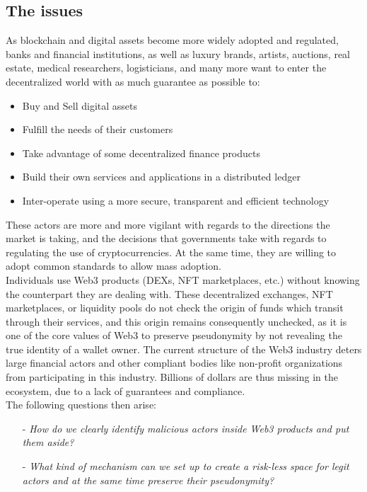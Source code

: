 ﻿\documentclass[a4paper]{article}
\begin{document}
\subsection{The issues}
As blockchain and digital assets become more widely adopted and regulated, banks and financial institutions, as well as luxury brands, artists, auctions, real estate, medical researchers, logisticians, and many more want to enter the decentralized world with as much guarantee as possible to:

\begin{itemize}
\item Buy and Sell digital assets
\item Fulfill the needs of their customers
\item Take advantage of some decentralized finance products
\item Build their own services and applications in a distributed ledger
\item Inter-operate using a more secure, transparent and efficient technology
\end{itemize}

These actors are more and more vigilant with regards to the directions the market is taking, and the decisions that governments take with regards to regulating the use of cryptocurrencies. At the same time, they are willing to adopt common standards to allow mass adoption. \\

Individuals use Web3 products (DEXs, NFT marketplaces, etc.) without knowing the counterpart they are dealing with. These decentralized exchanges, NFT marketplaces, or liquidity pools do not check the origin of funds which transit through their services, and this origin remains consequently unchecked, as it is  one of the core values of Web3 to preserve pseudonymity by not revealing the true identity of a wallet owner. The current structure of the Web3 industry deters large financial actors and other compliant bodies like non-profit organizations from participating in this industry. Billions of dollars are thus missing in the ecosystem, due to a lack of guarantees and compliance. \\

The following questions then arise: 

\begin{itemize}
\item[-] {\it How do we clearly identify malicious actors inside Web3 products and put them aside?}

\item[-] {\it What kind of mechanism can we set up to create a risk-less space for legit actors and at the same time preserve their pseudonymity?}
\end{itemize}
\end{document}
